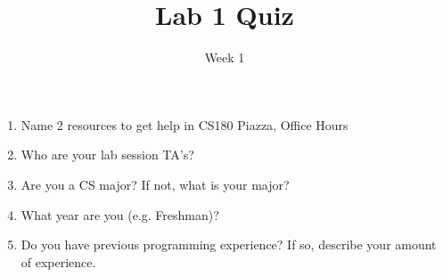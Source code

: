 \documentclass[addpoints]{exam}
\title{Lab 1 Quiz}
\date{Week 1}
\begin{document}
 

\Instructions
\begin{enumerate}

\item {} Name 2 resources to get help in CS180
\newline
\newline
\Ans Piazza, Office Hours
\newline

\item {} Who are your lab session TA's?
\newline
\newline
\newline

\item {} Are you a CS major? If not, what is your major?
\newline
\newline
\newline

\item {} What year are you (e.g. Freshman)?
\newline
\newline
\newline

\item {} Do you have previous programming experience? If so, describe your amount of experience.
\newline
\newline
\newline
\end{enumerate}
\end{document}
